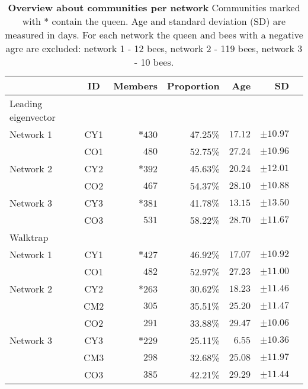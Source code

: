 \begin{table}
\centering
\caption[Overview about communities]{\textbf{Overview about communities per network} Communities marked with * contain the queen. Age and standard deviation (SD) are measured in days. For each network the queen and bees with a negative agre are excluded: network 1 - 12 bees, network 2 - 119 bees, network 3 - 10 bees.}
\label{tab:communities}
\vspace*{5mm}
\begin{tabular}{lcrrrrr}
	\toprule
	{}  & ID & Members & Proportion & Age & SD\\
	\midrule
	\rowcolor{Gray}
	Leading eigenvector &&&&&\\
	\midrule 
	\quad Network 1  & CY1 & $*430$  & 47.25\% & $17.12$ & $\pm10.97$ \\
	                 & CO1 & $480$   & 52.75\% & $27.24$ & $\pm10.96$ \\
	\midrule   							
	\quad Network 2  & CY2 & $*392$  & 45.63\% & $20.24$ & $\pm12.01$ \\
	                 & CO2 & $467$   & 54.37\% & $28.10$ & $\pm10.88$ \\
	\midrule  
	\quad Network 3  & CY3 & $*381$  & 41.78\% & $13.15$ & $\pm13.50$ \\
	                 & CO3 & $531$   & 58.22\% & $28.70$ & $\pm11.67$ \\
    \midrule
    \rowcolor{Gray}
    Walktrap &&&&&\\
    \midrule 
	\quad Network 1 & CY1 & $*427$ & 46.92\% & $17.07$ & $\pm10.92$\\
	                & CO1 & $482$  & 52.97\% & $27.23$ & $\pm11.00$\\
	\midrule
	\quad Network 2 & CY2 & $*263$ & 30.62\% & $18.23$ & $\pm11.46$\\
				    & CM2 & $305$  & 35.51\% & $25.20$ & $\pm11.47$\\
				    & CO2 & $291$  & 33.88\% & $29.47$ & $\pm10.06$\\            
	\midrule
	\quad Network 3 & CY3 & $*229$  & 25.11\% & $6.55$  & $\pm10.36$\\
					& CM3 & $298$  & 32.68\% & $25.08$ & $\pm11.97$\\
					& CO3 & $385$  & 42.21\% & $29.29$ & $\pm11.44$\\
	\bottomrule
\end{tabular}
\end{table}